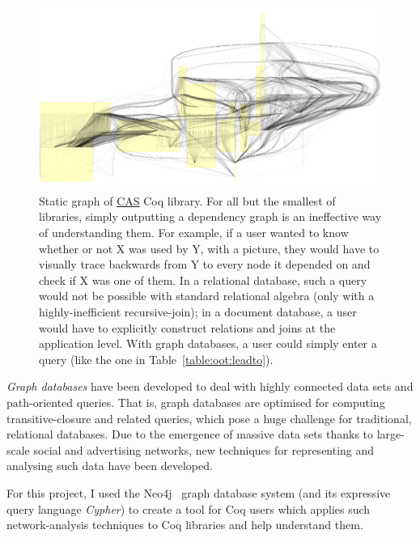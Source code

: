 \begin{figure}[t]

  \centering
  \includegraphics[width=\textwidth, page=1]{img/static-CAS-small.pdf}

  \caption{Static graph of \href{https://github.com/Timothy-G-Griffin/CAS}{CAS}
    Coq library. For all but the smallest of libraries, simply outputting a
    dependency graph is an ineffective way of understanding them. For example,
    if a user wanted to know whether or not X was used by Y, with a picture,
    they would have to visually trace backwards from Y to every node it depended
    on and check if X was one of them. In a relational database, such a query
    would not be possible with standard relational algebra (only with a
    highly-inefficient recursive-join); in a document database, a user would
    have to explicitly construct relations and joins at the application level.
    With graph databases, a user could simply enter a query (like the one in
    Table~\ref{table:oot:leadto}).}\label{fig:static}

\end{figure}

\emph{Graph databases} have been developed to deal with highly connected data
sets and path-oriented queries. That is, graph databases are optimised for
computing transitive-closure and related queries, which pose a huge challenge
for traditional, relational databases. Due to the emergence of massive data
sets thanks to large-scale social and advertising networks, new techniques for
representing and analysing such data have been developed.

For this project, I used the Neo4j~\cite{neo4j} graph database system (and its
expressive query language \emph{Cypher}) to create a tool for Coq users which
applies such network-analysis techniques to Coq libraries and help understand
them.

